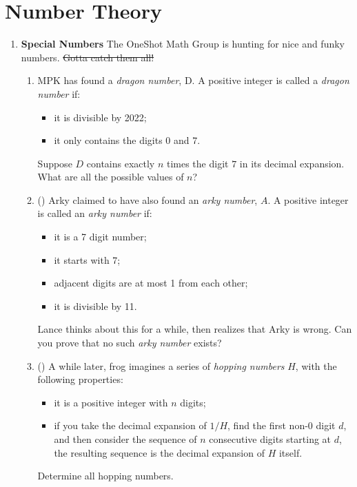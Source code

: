 \documentclass[11pt]{scrartcl}
\begin{document}
\section{Number Theory}
\begin{enumerate}[label=\textbf{N\arabic*}.]
    \item \textbf{Special Numbers} \newline
    The OneShot Math Group is hunting for nice and funky numbers. \sout{Gotta catch them all!}
    \begin{enumerate}
        \item MPK has found a \textit{dragon number}, D. A positive integer is called a \textit{dragon number} if:
        \begin{itemize}
            \item it is divisible by 2022;
            \item it only contains the digits 0 and 7.
        \end{itemize}
        Suppose $D$ contains exactly $n$ times the digit $7$ in its decimal expansion. What are all the possible values of $n$?
        
        \item (\halfchili) Arky claimed to have also found an \textit{arky number}, $A$. A positive integer is called an \textit{arky number} if:
        \begin{itemize}
            \item it is a 7 digit number;
            \item it starts with 7;
            \item adjacent digits are at most 1 from each other;
            \item it is divisible by 11.
        \end{itemize}
        Lance thinks about this for a while, then realizes that Arky is wrong. Can you prove that no such \textit{arky number} exists?
        
        \item (\fullchili \fullchili) A while later, frog imagines a series of \textit{hopping numbers} $H$, with the following properties:
        \begin{itemize}
            \item it is a positive integer with $n$ digits;
            \item if you take the decimal expansion of $1/H$, find the first non-$0$ digit $d$, and then consider the sequence of $n$ consecutive digits starting at $d$, the resulting sequence is the decimal expansion of $H$ itself.
        \end{itemize}
        Determine all hopping numbers.
    \end{enumerate}
\end{enumerate}
\end{document}
